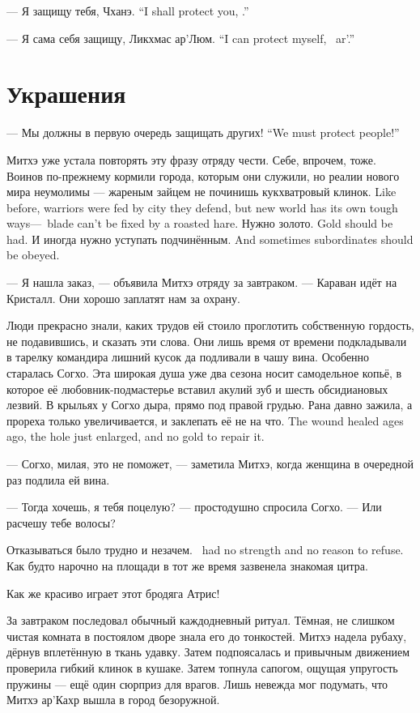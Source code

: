 {--- Я защищу тебя, Чханэ.}
{``I shall protect you, \Chhanei.''}

{--- Я сама себя защищу, Ликхмас ар’Люм.}
{``I can protect myself, \Likchmas\ ar'\Loem.''}

\section{Украшения}

{--- Мы должны в первую очередь защищать других!}
{``We must protect people!''}

Митхэ уже устала повторять эту фразу отряду чести.
Себе, впрочем, тоже.
{Воинов по-прежнему кормили города, которым они служили, но реалии нового мира неумолимы --- жареным зайцем не починишь кукхватровый клинок.}
{Like before, warriors were fed by city they defend, but new world has its own tough ways---\kukchuatr\ blade can't be fixed by a roasted hare.}
{Нужно золото.}
{Gold should be had.}
{И иногда нужно уступать подчинённым.}
{And sometimes subordinates should be obeyed.}

--- Я нашла заказ, --- объявила Митхэ отряду за завтраком.
--- Караван идёт на Кристалл.
Они хорошо заплатят нам за охрану.

Люди прекрасно знали, каких трудов ей стоило проглотить собственную гордость, не подавившись, и сказать эти слова.
Они лишь время от времени подкладывали в тарелку командира лишний кусок да подливали в чашу вина.
Особенно старалась Согхо.
Эта широкая душа уже два сезона носит самодельное копьё, в которое её любовник-подмастерье вставил акулий зуб и шесть обсидиановых лезвий.
В крыльях у Согхо дыра, прямо под правой грудью.
{Рана давно зажила, а прореха только увеличивается, и заклепать её не на что.}
{The wound healed ages ago, the hole just enlarged, and no gold to repair it.}

--- Согхо, милая, это не поможет, --- заметила Митхэ, когда женщина в очередной раз подлила ей вина.

--- Тогда хочешь, я тебя поцелую? --- простодушно спросила Согхо.
--- Или расчешу тебе волосы?

{Отказываться было трудно и незачем.}
{\Mitchoe\ had no strength and no reason to refuse.}
Как будто нарочно на площади в тот же время зазвенела знакомая цитра.

Как же красиво играет этот бродяга Атрис!

За завтраком последовал обычный каждодневный ритуал.
Тёмная, не слишком чистая комната в постоялом дворе знала его до тонкостей.
Митхэ надела рубаху, дёрнув вплетённую в ткань удавку.
Затем подпоясалась и привычным движением проверила гибкий клинок в кушаке.
Затем топнула сапогом, ощущая упругость пружины --- ещё один сюрприз для врагов.
Лишь невежда мог подумать, что Митхэ ар'Кахр вышла в город безоружной.

